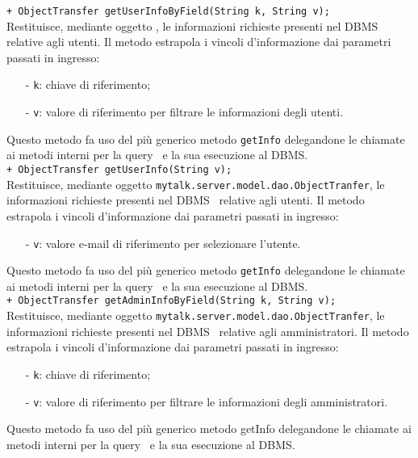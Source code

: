 {\begin{sloppypar}
{{{{\begin{itemize}
{				\texttt{+ ObjectTransfer getUserInfoByField(String k, String v);}\\
				Restituisce, mediante oggetto , le informazioni richieste presenti nel DBMS\g~ relative agli utenti. Il metodo estrapola i vincoli d'informazione dai parametri passati in ingresso:
				\begin{itemize}
					\item[-] \texttt{k}: chiave di riferimento;
					\item[-] \texttt{v}: valore di riferimento per filtrare le informazioni degli utenti.
				\end{itemize}
				Questo metodo fa uso del più generico metodo \texttt{getInfo} delegandone le chiamate ai metodi interni per la query\g~ e la sua esecuzione al DBMS\g.\\
				
				\texttt{+ ObjectTransfer getUserInfo(String v);}\\
				Restituisce, mediante oggetto \texttt{mytalk.server.model.dao.ObjectTranfer}, le informazioni richieste presenti nel DBMS\g~ relative agli utenti. Il metodo estrapola i vincoli d'informazione dai parametri passati in ingresso:
				\begin{itemize}
					\item[-] \texttt{v}: valore e-mail di riferimento per selezionare l'utente.
				\end{itemize}
				Questo metodo fa uso del più generico metodo \texttt{getInfo} delegandone le chiamate ai metodi interni per la query\g~ e la sua esecuzione al DBMS\g.\\
	
				\texttt{+ ObjectTransfer getAdminInfoByField(String k, String v);}\\
				Restituisce, mediante oggetto \texttt{mytalk.server.model.dao.ObjectTranfer}, le informazioni richieste presenti nel DBMS\g~ relative agli amministratori. Il metodo estrapola i vincoli d'informazione dai parametri passati in ingresso:
				\begin{itemize}
					\item[-] \texttt{k}: chiave di riferimento;
					\item[-] \texttt{v}: valore di riferimento per filtrare le informazioni degli amministratori.
				\end{itemize}
				Questo metodo fa uso del più generico metodo getInfo delegandone le chiamate ai metodi interni per la query\g~ e la sua esecuzione al DBMS\g.\\
				
}
\end{itemize}}}}}
\end{sloppypar}}

